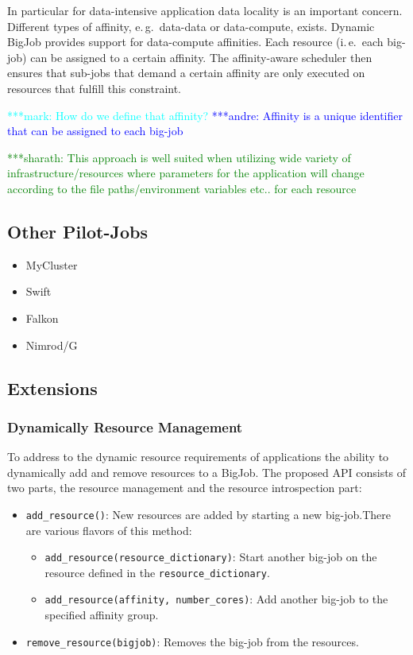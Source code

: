 \documentclass[]{article}
\newcommand{\alnote}[1]{ {\textcolor{blue} { ***andre: #1 }}}
\newcommand{\smnote}[1]{ {\textcolor{green} { ***sharath: #1 }}}
\newcommand{\msnote}[1]{ {\textcolor{cyan} { ***mark: #1 }}}
\newcommand{\alnote}[1]{}
\newcommand{\smnote}[1]{}
\begin{document}
In particular for data-intensive application data locality is an important
concern. Different types of affinity, e.\,g.\ data-data or data-compute, exists.
Dynamic BigJob provides support for data-compute affinities. Each resource
(i.\,e.\ each big-job) can be assigned to a certain affinity. The affinity-aware
scheduler then ensures that sub-jobs that demand a certain affinity are only
executed on resources that fulfill this constraint.



\msnote{How do we define that affinity?}\alnote{Affinity is a unique identifier 
that can be assigned to each big-job}

\smnote{This approach is well suited when utilizing wide variety of
infrastructure/resources where parameters for the application will change
according to the file paths/environment variables etc.. for each resource}

\subsection{Other Pilot-Jobs}

\begin{itemize}
    \item MyCluster
    \item Swift
    \item Falkon
    \item Nimrod/G
\end{itemize}


\subsection{Extensions}


\subsubsection{Dynamically Resource Management}

To address to the dynamic resource requirements of applications the ability to
dynamically add and remove resources to a BigJob. The proposed API consists of
two parts, the resource management and the resource introspection part:
\begin{itemize}
    \item \texttt{add\_resource()}: New resources are added by starting a new
    big-job.There are various flavors of this method:
    \begin{itemize}
        \item \texttt{add\_resource(re\-sour\-ce\_dic\-tionary)}: Start another big-job on the resource defined in the \texttt{resource\_dictionary}.
        \item \texttt{add\_resource(affinity, number\_cores)}: Add another big-job to the specified affinity group.
    \end{itemize}
    \item \texttt{remove\_resource(bigjob)}: Removes the big-job from the
    resources.
\end{itemize}
\end{document}
